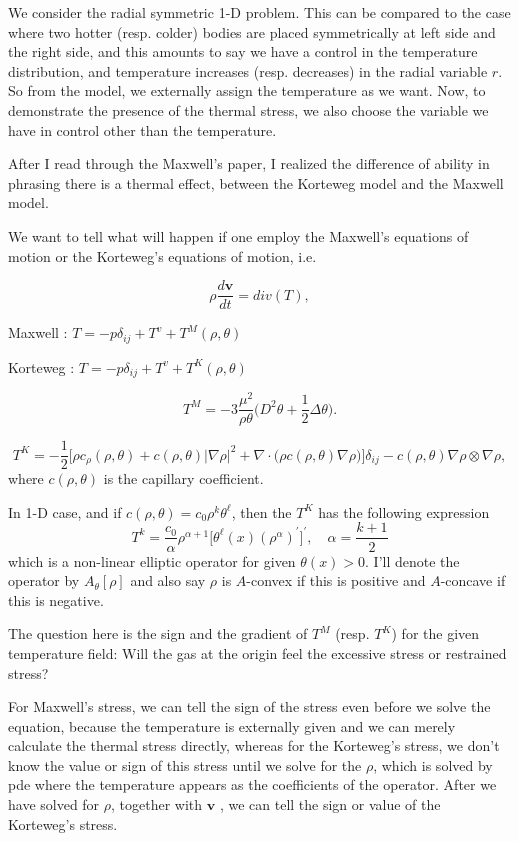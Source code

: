 \documentclass[a4paper,12pt]{article}
\begin{document}

We consider the radial symmetric 1-D problem. This can be compared to the case where two hotter (resp. colder) bodies are placed symmetrically at left side and the right side, and this amounts to say we have a control in the temperature distribution, and temperature increases (resp. decreases) in the radial variable $r$. So from the model, we externally assign the temperature as we want. Now, to demonstrate the presence of the thermal stress, we also choose the variable we have in control other than the temperature.

After I read through the Maxwell's paper, I realized the difference of ability in phrasing there is a thermal effect, between the Korteweg model and the Maxwell model.

We want to tell what will happen if one employ the Maxwell's equations of motion or the Korteweg's equations of motion, i.e.

$$ \rho \frac{d\mathbf{v}}{dt} = div(T),$$

Maxwell : {{{ $T = -p \delta_{ij} + T^v + T^M(\rho,\theta)$ }}}

Korteweg : {{{ $T= -p \delta_{ij} + T^v + T^K(\rho,\theta)$ }}}

{{{$$T^M = -3\frac{\mu^2}{\rho\theta} \big( D^2 \theta + \frac{1}{2}\Delta \theta\big).$$}}}

{{{$$ T^K = -\frac{1}{2} \Big[ \rho c_\rho (\rho,\theta) + c(\rho,\theta) |\nabla \rho|^2 + \nabla \cdot \big(\rho c(\rho,\theta) \nabla \rho\big) \Big] \delta_{ij} - c(\rho,\theta) \nabla \rho \otimes \nabla\rho,$$}}} where $c(\rho,\theta)$ is the capillary coefficient.

In 1-D case, and if {{{ $c(\rho,\theta) = c_0 \rho^k \theta^\ell$}}}, then the {{{$T^K$}}} has the following expression {{{ $$ T^k = \frac{c_0}{\alpha} \rho^{\alpha+1} \Big[ \theta^{\ell}(x) (\rho^{\alpha})^\prime \Big]^\prime, \quad \alpha = \frac{k+1}{2} $$}}} which is a non-linear elliptic operator for given $\theta(x)>0$. I'll denote the operator by {{{$ A_\theta[\rho]$}}} and also say $\rho$ is $A$-convex if this is positive and $A$-concave if this is negative.

The question here is the sign and the gradient of {{{$T^M$ (resp. $T^K$)}}} for the given temperature field: Will the gas at the origin feel the excessive stress or restrained stress?

For Maxwell's stress, we can tell the sign of the stress even before we solve the equation, because the temperature is externally given and we can merely calculate the thermal stress directly, whereas for the Korteweg's stress, we don't know the value or sign of this stress until we solve for the $\rho$, which is solved by pde where the temperature appears as the coefficients of the operator. After we have solved for $\rho$, together with $\mathbf{v}$ , we can tell the sign or value of the Korteweg's stress.
\end{document}
